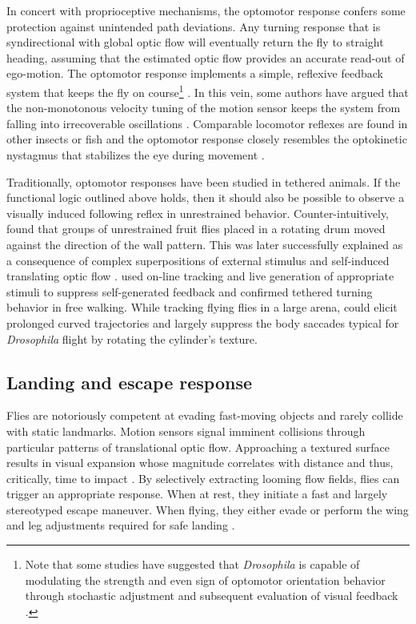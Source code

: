 In concert with proprioceptive mechanisms, the optomotor response confers some protection against unintended path deviations. Any turning response that is syndirectional with global optic flow will eventually return the fly to straight heading, assuming that the estimated optic flow provides an accurate read-out of ego-motion. The optomotor response implements a simple, reflexive feedback system that keeps the fly on course\footnote{Note that some studies have suggested that \textit{Drosophila} is capable of modulating the strength and even sign of optomotor orientation behavior through stochastic adjustment and subsequent evaluation of visual feedback \citep{Wolf:1986ii,Wolf:1992aa}.} \citep{Borst:2014kl}. In this vein, some authors have argued that the non-monotonous velocity tuning of the motion sensor keeps the system from falling into irrecoverable oscillations \citep{Warzecha:1996bm}. Comparable locomotor reflexes are found in other insects or fish \citep{Arnold:1974aa,Portugues:2009aa} and the optomotor response closely resembles the optokinetic nystagmus that stabilizes the eye during movement \citep{Buttner:2007aa}.

Traditionally, optomotor responses have been studied in tethered animals. If the functional logic outlined above holds, then it should also be possible to observe a visually induced following reflex in unrestrained behavior. Counter-intuitively, \citet{Goetz:1970aa} found that groups of unrestrained fruit flies placed in a rotating drum moved against the direction of the wall pattern. This was later successfully explained as a consequence of complex superpositions of external stimulus and self-induced translating optic flow \citep{Goetz:1975aa}. \citet{Strauss:1997ut} used on-line tracking and live generation of appropriate stimuli to suppress self-generated feedback and confirmed tethered turning behavior in free walking. While tracking flying flies in a large arena, \citet{Mronz:2008eb} could elicit prolonged curved trajectories and largely suppress the body saccades typical for \textit{Drosophila} flight by rotating the cylinder's texture.

\subsection{Landing and escape response}
Flies are notoriously competent at evading fast-moving objects and rarely collide with static landmarks. Motion sensors signal imminent collisions through particular patterns of translational optic flow. Approaching a textured surface results in visual expansion whose magnitude correlates with distance and thus, critically, time to impact \citep{Koenderink:1986um}. By selectively extracting looming flow fields, flies can trigger an appropriate response. When at rest, they initiate a fast and largely stereotyped escape maneuver. When flying, they either evade or perform the wing and leg adjustments required for safe landing \citep{Borst:2014kl}.

